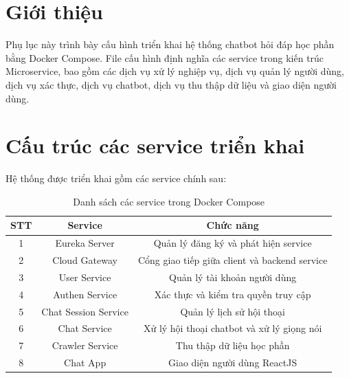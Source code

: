 \documentclass[../DoAn.tex]{subfiles}
\begin{document}
\section{Giới thiệu}

Phụ lục này trình bày cấu hình triển khai hệ thống chatbot hỏi đáp học phần bằng Docker Compose.
File cấu hình định nghĩa các service trong kiến trúc Microservice, bao gồm các dịch vụ xử lý nghiệp vụ,
dịch vụ quản lý người dùng, dịch vụ xác thực, dịch vụ chatbot, dịch vụ thu thập dữ liệu và giao diện người dùng.

\section{Cấu trúc các service triển khai}

Hệ thống được triển khai gồm các service chính sau:

\begin{table}[H]
    \centering
    \renewcommand{\arraystretch}{1.8}
    \begin{tabular}{|c|c|c|}
        \hline
        \textbf{STT} & \textbf{Service}     & \textbf{Chức năng}                            \\
        \hline
        1            & Eureka Server        & Quản lý đăng ký và phát hiện service          \\
        \hline
        2            & Cloud Gateway        & Cổng giao tiếp giữa client và backend service \\
        \hline
        3            & User Service         & Quản lý tài khoản người dùng                  \\
        \hline
        4            & Authen Service       & Xác thực và kiểm tra quyền truy cập           \\
        \hline
        5            & Chat Session Service & Quản lý lịch sử hội thoại                     \\
        \hline
        6            & Chat Service         & Xử lý hội thoại chatbot và xử lý giọng nói    \\
        \hline
        7            & Crawler Service      & Thu thập dữ liệu học phần                     \\
        \hline
        8            & Chat App             & Giao diện người dùng ReactJS                  \\
        \hline
    \end{tabular}
    \caption{Danh sách các service trong Docker Compose}

\end{table}
\end{document}
